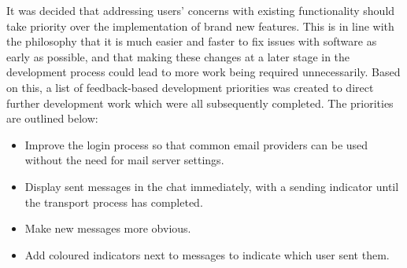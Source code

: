 It was decided that addressing users' concerns with existing functionality should take priority over the implementation of brand new features. This is in line with the philosophy that it is much easier and faster to fix issues with software as early as possible, and that making these changes at a later stage in the development process could lead to more work being required unnecessarily. Based on this, a list of feedback-based development priorities was created to direct further development work which were all subsequently completed. The priorities are outlined below:

\begin{itemize}
  \item Improve the login process so that common email providers can be used without the need for mail server settings.
  \item Display sent messages in the chat immediately, with a sending indicator until the transport process has completed.
  \item Make new messages more obvious.
  \item Add coloured indicators next to messages to indicate which user sent them.
\end{itemize}